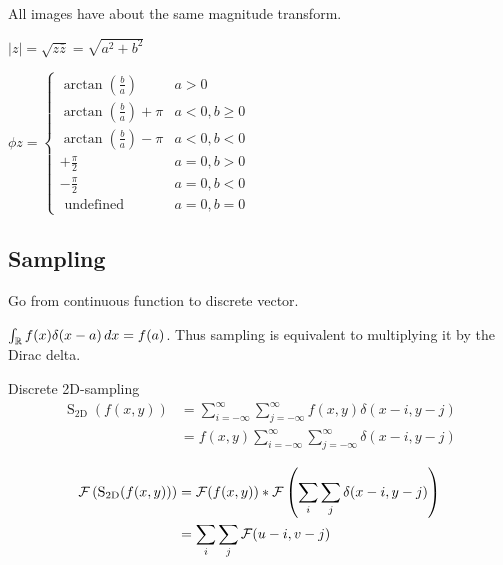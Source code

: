 \begin{theorem}
  All images have about the same magnitude transform.
\end{theorem}

\begin{definition}[Magnitude of \(z \in \C\)]
  \(|z| = \sqrt{z \overline{z}} = \sqrt{a^2 + b^2}\)
\end{definition}

\begin{definition}[Phase of \(z \in \C\)]
  \(\phi{z} =\left\{\begin{array}{ll}\arctan \left(\frac{b}{a}\right) & a>0 \\ \arctan \left(\frac{b}{a}\right)+\pi & a<0, b \geq 0 \\ \arctan \left(\frac{b}{a}\right)-\pi & a<0, b<0 \\ +\frac{\pi}{2} & a=0, b>0 \\ -\frac{\pi}{2} & a=0, b<0 \\ \text { undefined } & a=0, b=0\end{array}\right.\)
\end{definition}

\subsection{Sampling}
Go from continuous function to discrete vector.

\begin{definition}
  \(\int_{\operatorname{\mathbb{R}}}f(x)\delta(x - a) \,dx = f(a)\). Thus sampling is equivalent to multiplying it by the Dirac delta.
\end{definition}

\begin{definition}
  Discrete 2D-sampling
  \[\begin{aligned} \operatorname{S}_{2 \mathrm{D}}(f(x, y)) & =\sum_{i=-\infty}^{\infty} \sum_{j=-\infty}^{\infty} f(x, y) \delta(x-i, y-j) \\ & =f(x, y) \sum_{i=-\infty}^{\infty} \sum_{j=-\infty}^{\infty} \delta(x-i, y-j)\end{aligned}\]
\end{definition}

\begin{definition}
  \begin{align*}
    \operatorname{\mathcal{F}}\left(\operatorname{S}_{2 \mathrm{D}}(f(x, y))\right) & = \operatorname{\mathcal{F}}(f(x, y)) \ast \operatorname{\mathcal{F}}\left(\sum_{i} \sum_{j} \delta(x-i, y-j)\right) \\
    & = \sum_i \sum_j \operatorname{\mathcal{F}}(u - i, v - j)
  \end{align*}
\end{definition}

